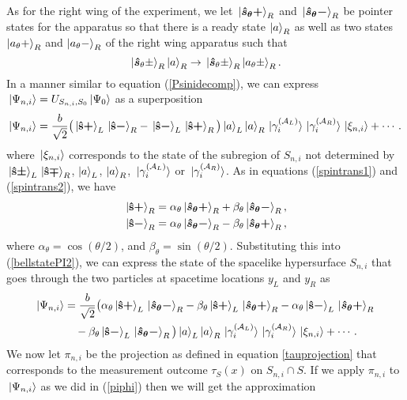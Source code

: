 As for the right wing of the experiment, we let  $\ket*{\bm{\hat{s}_\theta+}}_R$ and $\ket*{\bm{\hat{s}_\theta-}}_R$ be pointer states for the apparatus so that there is a ready state $\ket{a}_R$  as well as two states $\ket{a_\theta+}_R$ and $\ket{a_\theta-}_R$ of the right wing apparatus such that 
$$\ket*{\bm{\hat{s}}_\theta\pm}_R\ket{a}_R\rightarrow\ket*{\bm{\hat{s}}_\theta\pm}_R\ket{a_\theta\pm}_R.$$
In a manner similar to equation (\ref{Psinidecomp}), we can express $\ket*{\Psi_{n,i}}=U_{S_{n,i},S_0}\ket*{\Psi_0}$ as a superposition
\begin{equation}\label{bellstatePI2}
	\ket{\Psi_{n,i}}= \frac{b}{\sqrt{2}}\big(\ket*{\vb{\hat{{s}}}\bm{+}}_L\ket*{\vb{\hat{{s}}}\bm{-}}_R-\ket*{\vb{\hat{{s}}}\bm{-}}_L\ket*{\vb{\hat{{s}}}\bm{+}}_R\big)\ket{a}_L\ket{a}_R\ket*{\gamma_i^{(\mathcal{A}_L)}}\ket*{\gamma_i^{(\mathcal{A}_R)}}\ket*{\xi_{n,i}}+\cdots.
\end{equation}
where $\ket*{\xi_{n,i}}$ corresponds to the state of the subregion of $S_{n,i}$ not determined by $\ket*{\vb{\hat{{s}}}\bm{\pm}}_L\ket*{\vb{\hat{{s}}}\bm{\mp}}_R$, $\ket{a}_L$, $\ket{a}_R$, $\ket*{\gamma_i^{(\mathcal{A}_L)}}$ or $\ket*{\gamma_i^{(\mathcal{A}_R)}}$.
As in equations (\ref{spintrans1}) and (\ref{spintrans2}), we have
\begin{align*}
\ket*{\vb{\hat{{s}}}\bm{+}}_R&= \alpha_\theta\ket*{\bm{\hat{s}_\theta+}}_R+\beta_\theta \ket*{\bm{\hat{s}_\theta-}}_R,\\
\ket*{\vb{\hat{{s}}}\bm{-}}_R&= \alpha_\theta\ket*{\bm{\hat{s}_\theta-}}_R-\beta_\theta \ket*{\bm{\hat{s}_\theta+}}_R,
\end{align*}
where $\alpha_\theta=\cos(\theta/2)$, and $\beta_\theta=\sin(\theta/2).$
Substituting this into (\ref{bellstatePI2}), we can express the state of the spacelike hypersurface $S_{n,i}$ that goes through the two particles at spacetime locations $y_L$ and $y_R$ as
\begin{equation}\label{bellstatePI3}
	\begin{split}
	\ket{\Psi_{n,i}}&=\frac{b}{\sqrt{2}}\big(\alpha_\theta\ket*{\vb{\hat{{s}}}\bm{+}}_L\ket*{\bm{\hat{s}_\theta-}}_R
	-\beta_\theta\ket*{\vb{\hat{{s}}}\bm{+}}_L\ket*{\bm{\hat{s}_\theta+}}_R-\alpha_\theta\ket*{\vb{\hat{{s}}}\bm{-}}_L\ket*{\bm{\hat{s}_\theta+}}_R\\
	&\quad
	-\beta_\theta\ket*{\vb{\hat{{s}}}\bm{-}}_L\ket*{\bm{\hat{s}_\theta-}}_R\big)\ket{a}_L\ket{a}_R\ket*{\gamma_i^{(\mathcal{A}_L)}}\ket*{\gamma_i^{(\mathcal{A}_R)}}\ket*{\xi_{n,i}}+\cdots.
	\end{split}
\end{equation}
We now let $\pi_{n,i}$ be the projection as defined in equation \ref{tauprojection} that corresponds to the measurement outcome $\tau_S(x)$ on $S_{n,i}\cap S$. If we apply $\pi_{n,i}$ to $\ket*{\Psi_{n,i}}$ as we did in (\ref{piphi}) then we will get the approximation

